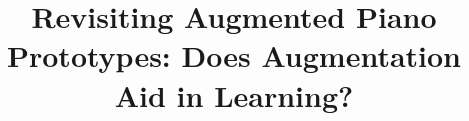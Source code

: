 \documentclass[sigchi, review]{acmart}
\begin{document}
\title{Revisiting Augmented Piano Prototypes: Does Augmentation Aid in Learning? }




\end{document}
